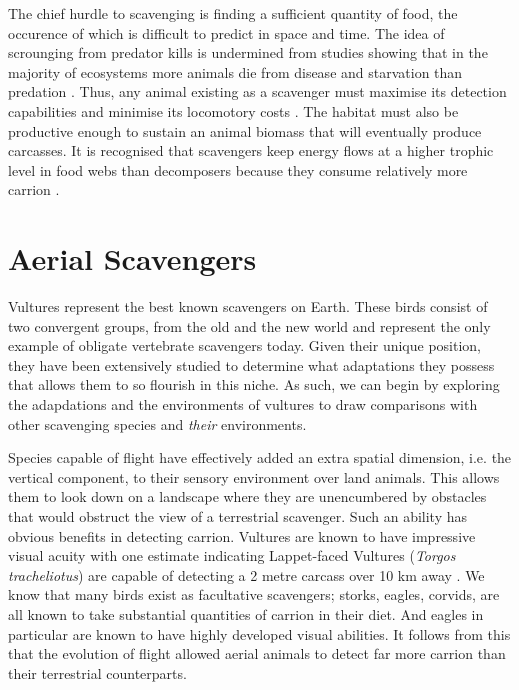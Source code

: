 \documentclass[a4paper,12pt]{article}
\begin{document}
The chief hurdle to scavenging is finding a sufficient quantity of food, the occurence of which is difficult to predict in space and time. The idea of scrounging from predator kills is undermined from studies showing that in the  majority of ecosystems more animals die from disease and starvation than predation \citep{benbow2015introduction}. Thus, any animal existing as a scavenger must maximise its detection capabilities and minimise its locomotory costs \citep{ruxton2004obligate}. The habitat must also be productive enough to sustain an animal biomass that will eventually produce carcasses. It is recognised that scavengers keep energy flows at a higher trophic level in food webs than decomposers because they consume relatively more carrion \citep{devault2003scavenging}. 

\section*{Aerial Scavengers}

Vultures represent the best known scavengers on Earth. These birds consist of two convergent groups, from the old and the new world and represent the only example of obligate vertebrate scavengers today. Given their unique position, they have been extensively studied to determine what adaptations they possess that allows them to so flourish in this niche. As such, we can begin by exploring the adapdations and the environments of vultures to draw comparisons with other scavenging species and \textit{their} environments. 

Species capable of flight have effectively added an extra spatial dimension, i.e. the vertical component, to their sensory environment over land animals. This allows them to look down on a landscape where they are unencumbered by obstacles that would obstruct the view of a terrestrial scavenger. Such an ability has obvious benefits in detecting carrion. Vultures are known to have impressive visual acuity with one estimate indicating Lappet-faced Vultures (\textit{Torgos tracheliotus}) are capable of detecting a 2 metre carcass over 10 km away \citep{spiegel2013factors}. We know that many birds exist as facultative scavengers; storks, eagles, corvids, are all known to take substantial quantities of carrion in their diet. And eagles in particular are known to have highly developed visual abilities. It follows from this that the evolution of flight allowed aerial animals to detect far more carrion than their terrestrial counterparts.
\end{document}
